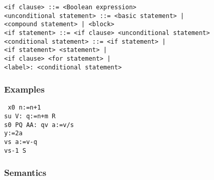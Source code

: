 \documentclass[a4paper,11pt]{article}
\begin{document}
\begin{flushleft}
\vspace{0.2em}\texttt{<if clause> ::=  <Boolean expression> }\\

\vspace{0.2em}\texttt{<unconditional statement> ::= <basic statement> |\\
  \hspace{1.0cm}<compound statement> | <block>}\\

\vspace{0.2em}\texttt{<if statement> ::= <if clause> <unconditional statement>}\\

\vspace{0.2em}\texttt{<conditional statement> ::= <if statement> |\\
  \hspace{1.0cm}<if statement>  <statement> |\\
  \hspace{1.0cm}<if clause> <for statement> |\\
  \hspace{1.0cm}<label>: <conditional statement>}\\
\end{flushleft}


\subsubsection{Examples}

\begin{flushleft}
\texttt{ x\mgt{}0  n:=n+1\\
 s\mgt{}u  V: q:=n+m   R\\
 s\mlt{}0 \mlor{} P\mle{}Q  AA:   q\mlt{}v  a:=v/s\\
\hspace{7.25cm} y:=2\mtim{}a \\
\hspace{2.8cm}  v\mgt{}s  a:=v-q\\
\hspace{5.1cm}  v\mgt{}s-1   S}\\
\end{flushleft}

\subsubsection{Semantics}
\label{LblConditionalStatementsSemantics}
\end{document}
